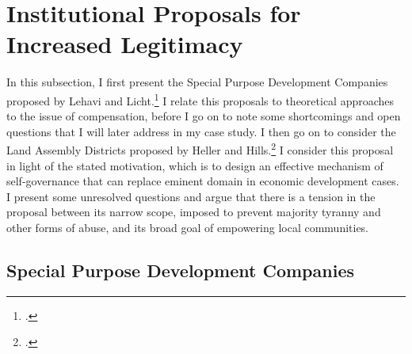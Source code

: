 %

\section{Institutional Proposals for Increased Legitimacy}\label{sec:ir}

In this subsection, I first present the Special Purpose Development Companies proposed by Lehavi and Licht.\footcite{lehavi07} I relate this proposals to theoretical approaches to the issue of compensation, before I go on to note some shortcomings and open questions that I will later address in my case study. I then go on to consider the Land Assembly Districts proposed by Heller and Hills.\footcite{heller08} I consider this proposal in light of the stated motivation, which is to design an effective mechanism of self-governance that can replace eminent domain in economic development cases. I present some unresolved questions and argue that there is a tension in the proposal between its narrow scope, imposed to prevent majority tyranny and other forms of abuse, and its broad goal of empowering local communities. 

\subsection{Special Purpose Development Companies}

